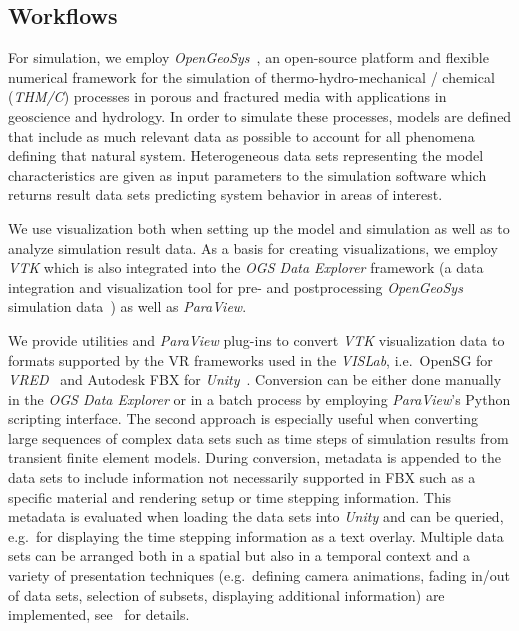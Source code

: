 \documentclass[twocolumn]{svjour3}          %
\begin{document}
\subsection{Workflows}
\label{workflows}

For simulation, we employ \emph{OpenGeoSys}~\cite{kolditz:ogs}, an open-source platform and flexible numerical framework for the simulation of thermo-hydro-mechanical / chemical (\emph{THM/C}) processes in porous and fractured media with applications in geoscience and hydrology. In order to simulate these processes, models are defined that include as much relevant data as possible to account for all phenomena defining that natural system. Heterogeneous data sets representing the model characteristics are given as input parameters to the simulation software which returns result data sets predicting system behavior in areas of interest.

We use visualization both when setting up the model and simulation as well as to analyze simulation result data. As a basis for creating visualizations, we employ \emph{VTK} which is also integrated into the \emph{OGS Data Explorer} framework (a data integration and visualization tool for pre- and postprocessing \emph{OpenGeoSys} simulation data~\cite{rink:eesenvirvis}) as well as \emph{ParaView}.

We provide utilities and \emph{ParaView} plug-ins to convert \emph{VTK} visualization data to formats supported by the VR frameworks used in the \emph{VISLab}, i.e.~OpenSG for \emph{VRED}~\cite{bilke:vtkosgconverter} and Autodesk FBX for \emph{Unity}~\cite{bilke:vtkfbxconverter}. Conversion can be either done manually in the \emph{OGS Data Explorer} or in a batch process by employing \emph{ParaView}'s Python scripting interface. The second approach is especially useful when converting large sequences of complex data sets such as time steps of simulation results from transient finite element models. During conversion, metadata is appended to the data sets to include information not necessarily supported in FBX such as a specific material and rendering setup or time stepping information. This metadata is evaluated when loading the data sets into \emph{Unity} and can be queried, e.g.~for displaying the time stepping information as a text overlay. Multiple data sets can be arranged both in a spatial but also in a temporal context and a variety of presentation techniques (e.g.~defining camera animations, fading in/out of data sets, selection of subsets, displaying additional information) are implemented, see~\cite{rink:eesenvirvis} for details.
\end{document}
